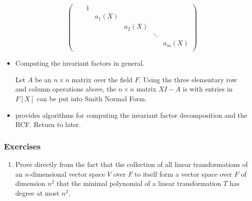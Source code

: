 \documentclass[../notes.tex]{subfiles}
\begin{document}
\begin{itemize}
\begin{equation*}
\begin{pmatrix}
            && 1\\
            &&& a_1(X)\\
            &&&& a_2(X)\\
            &&&&& \ddots\\
            &&&&&& a_m(X)\\
        \end{pmatrix}
    \end{equation*}
    \item Computing the invariant factors in general.
    \begin{theorem}\label{trm:12.21}
        Let $A$ be an $n\times n$ matrix over the field $F$. Using the three elementary row and column operations above, the $n\times n$ matrix $XI-A$ is with entries in $F[X]$ can be put into Smith Normal Form.
    \end{theorem}
    \item \textcite{bib:DummitFoote} provides algorithms for computing the invariant factor decomposition and the RCF. Return to later.
\end{itemize}

\subsubsection*{Exercises}
\begin{enumerate}[label={\textbf{\arabic*.}},ref={12.2.\arabic*},start=5]
    \item \label{exr:12.2.5}Prove directly from the fact that the collection of all linear transformations of an $n$-dimensional vector space $V$ over $F$ to itself form a vector space over $F$ of dimension $n^2$ that the minimal polynomial of a linear transformation $T$ has degree at most $n^2$.
\end{enumerate}
\end{document}
